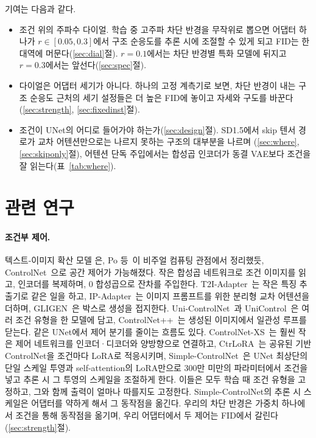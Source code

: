 \documentclass[10pt,twocolumn,a4paper]{article}
\begin{document}
기여는 다음과 같다.

\begin{itemize}\itemsep2pt
\item 조건 위의 주파수 다이얼. 학습 중 고주파 차단 반경을 무작위로 뽑으면 어댑터
      하나가 $r \in [0.05, 0.3]$에서 구조 순응도를 추론 시에 조절할 수 있게 되고 FID는
      한 대역에 머문다(\ref{sec:dial}절). $r{=}0.1$에서는 차단 반경별 특화 모델에
      뒤지고 $r{=}0.3$에서는 앞선다(\ref{sec:spec}절).
\item 다이얼은 어댑터 세기가 아니다. 하나의 고정 계측기로 보면, 차단 반경이 내는
      구조 순응도 근처의 세기 설정들은 더 높은 FID에 놓이고 자세와 구도를 바꾼다
      (\ref{sec:strength}, \ref{sec:fixedinst}절).
\item 조건이 UNet의 어디로 들어가야 하는가(\ref{sec:design}절). SD1.5에서 skip 텐서
      경로가 교차 어텐션만으로는 나르지 못하는 구조의 대부분을 나르며
      (\ref{sec:where}, \ref{sec:skiponly}절), 어텐션 단독 주입에서는 합성곱 인코더가
      동결 VAE보다 조건을 잘 읽는다(표~\ref{tab:where}).
\end{itemize}

\section{관련 연구}

\paragraph{조건부 제어.} 텍스트-이미지 확산 모델
\cite{ho2020denoising,song2020denoising,rombach2021high,nichol2021glide,saharia2022photorealistic}은,
Po 등~\cite{po2024state}이 비주얼 컴퓨팅 관점에서 정리했듯,
ControlNet~\cite{zhang2023adding}으로 공간 제어가 가능해졌다. 작은 합성곱 네트워크로 조건
이미지를 읽고, 인코더를 복제하며, 0 합성곱으로 잔차를 주입한다.
T2I-Adapter~\cite{mou2023adapter}는 작은 특징 추출기로 같은 일을 하고,
IP-Adapter~\cite{ye2023adapter}는 이미지 프롬프트를 위한 분리형 교차 어텐션을 더하며,
GLIGEN~\cite{li2023gligen}은 박스로 생성을 접지한다. Uni-ControlNet~\cite{zhao2023controlnet}과
UniControl~\cite{qin2023unicontrol}은 여러 조건 유형을 한 모델에 담고,
ControlNet++~\cite{li2024controlnet}는 생성된 이미지에서 일관성 루프를 닫는다. 같은
UNet에서 제어 분기를 줄이는 흐름도 있다. ControlNet-XS~\cite{zavadski2023controlnet}는 훨씬
작은 제어 네트워크를 인코더·디코더와 양방향으로 연결하고, CtrLoRA~\cite{xu2024ctrlora}는
공유된 기반 ControlNet을 조건마다 LoRA로 적응시키며,
Simple-ControlNet~\cite{feng2025simplifying}은 UNet 최상단의 단일 스케일 투영과
self-attention의 LoRA만으로 300만 미만의 파라미터에서 조건을 넣고 추론 시 그 투영의
스케일을 조절하게 한다. 이들은 모두 학습 때 조건 유형을 고정하고, 그와 함께 출력이
얼마나 따를지도 고정한다. Simple-ControlNet의 추론 시 스케일은 어댑터를 약하게 해서 그
동작점을 옮긴다. 우리의 차단 반경은 가중치 하나에서 조건을 통해 동작점을 옮기며, 우리
어댑터에서 두 제어는 FID에서 갈린다(\ref{sec:strength}절).
\end{document}
